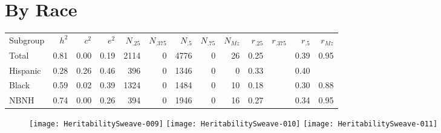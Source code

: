 \documentclass[a4paper]{article}
\begin{document}
\newpage
\section{By Race}
\begin{table}[ht]
\begin{center}
\begin{tabular}{l|rrr|rrrrr|rrrr}
 Subgroup & $h^2$ & $c^2$ & $e^2$ & $N_{.25}$ & $N_{.375}$ & $N_{.5}$ & $N_{.75}$ & $N_{Mz}$ & $r_{.25}$ & $r_{.375}$ & $r_{.5}$ & $r_{Mz}$ \\ 
 Total & 0.81 & 0.00 & 0.19 & 2114 &   0 & 4776 &   0 &  26 & 0.25 &  & 0.39 & 0.95 \\ 
   \hline
Hispanic & 0.28 & 0.26 & 0.46 & 396 &   0 & 1346 &   0 &   0 & 0.33 &  & 0.40 &  \\ 
  Black & 0.59 & 0.02 & 0.39 & 1324 &   0 & 1484 &   0 &  10 & 0.18 &  & 0.30 & 0.88 \\ 
  NBNH & 0.74 & 0.00 & 0.26 & 394 &   0 & 1946 &   0 &  16 & 0.27 &  & 0.34 & 0.95 \\ 
  \end{tabular}
\end{center}
\end{table}\begin{figure}[htbp]
\texttt{[image: HeritabilitySweave-009]}
\texttt{[image: HeritabilitySweave-010]}
\texttt{[image: HeritabilitySweave-011]}
\end{figure}
\end{document}
